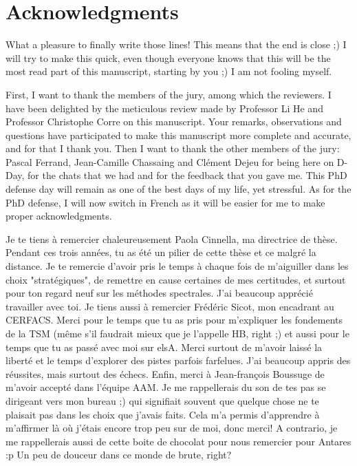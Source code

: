 
\chapter*{Acknowledgments}
\thispagestyle{empty}

What a pleasure to finally write those lines! This means that
the end is close ;)
I will try to make this quick, even though everyone knows that this
will be the most read part of this manuscript, starting by you ;)
I am not fooling myself.

First, I want to thank the members of the jury, among which the
reviewers. I have been
delighted by the meticulous review made by Professor Li He and Professor 
Christophe Corre on this manuscript. Your remarks, observations
and questions
have participated to make this manuscript more complete and accurate, and
for that I thank you.
Then I want to thank the other members of the jury: Pascal Ferrand, 
Jean-Camille Chassaing and Clément Dejeu for being here on D-Day,
for the chats that we had
and for the feedback that you gave me. This PhD defense day will remain as one of the
best days of my life, yet stressful.
As for the PhD defense, I will now switch in French as it will
be easier for me to make proper acknowledgments.

Je te tiens à remercier chaleureusement Paola Cinnella, ma
directrice de thèse. Pendant ces trois années, tu as été un pilier
de cette thèse et ce malgré la distance. 
Je te remercie d'avoir pris le temps à chaque fois
de m'aiguiller dans les choix "stratégiques", de remettre en cause
certaines de mes certitudes, et surtout pour ton regard neuf sur les méthodes
spectrales. J'ai beaucoup apprécié travailler avec toi.
Je tiens aussi à remercier Frédéric Sicot, mon encadrant au CERFACS.
Merci pour le temps que tu as pris pour m'expliquer les fondements de 
la TSM (même s'il faudrait mieux que je l'appelle HB, right ;)
et aussi pour le temps que tu as passé avec moi sur elsA. 
Merci surtout de m'avoir laissé la liberté et le temps
d'explorer des pistes parfois farfelues. J'ai beaucoup appris 
des réussites, mais surtout des échecs. Enfin, merci à Jean-françois Boussuge
de m'avoir accepté dans l'équipe AAM.
Je me rappellerais du son
de tes pas se dirigeant vers mon bureau ;) qui signifiait 
souvent que quelque chose ne te plaisait pas dans les choix que
j'avais faits.
Cela m'a permis d'apprendre à m'affirmer là où j'étais encore trop
peu sur de moi, donc merci! A contrario, je me rappellerais aussi 
de cette boite de chocolat pour nous remercier pour Antares :p
Un peu de douceur dans ce monde de brute, right?

